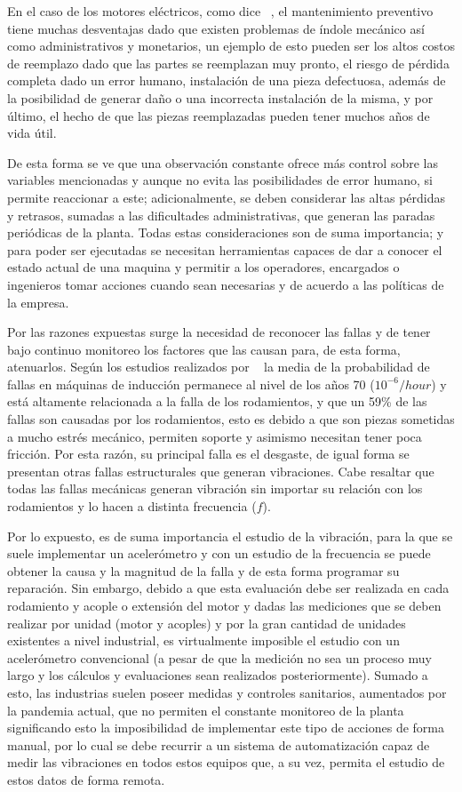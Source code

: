 En el caso de los motores eléctricos, como dice ~\textcite{Lacey}, el
mantenimiento preventivo tiene muchas desventajas dado que existen problemas de
índole mecánico así como administrativos y monetarios, un ejemplo de esto
pueden ser los altos costos de reemplazo dado que las partes se reemplazan muy
pronto, el riesgo de pérdida completa dado un error humano, instalación de una
pieza defectuosa, además de la posibilidad de generar daño o una incorrecta
instalación de la misma, y por último, el hecho de que las piezas reemplazadas
pueden tener muchos años de vida útil.

De esta forma se ve que una observación constante ofrece más control sobre las
variables mencionadas y aunque no evita las posibilidades de error humano, si
permite reaccionar a este; adicionalmente, se deben considerar las altas
pérdidas y retrasos, sumadas a las dificultades administrativas, que generan
las paradas periódicas de la planta. Todas estas consideraciones son de suma
importancia; y para poder ser ejecutadas se necesitan herramientas capaces de
dar a conocer el estado actual de una maquina y permitir a los operadores,
encargados o ingenieros tomar acciones cuando sean necesarias y de acuerdo a
las políticas de la empresa.

Por las razones expuestas surge la necesidad de reconocer las fallas y de tener
bajo continuo monitoreo los factores que las causan para, de esta forma,
atenuarlos. Según los estudios realizados por ~\textcite{Kammermann} la media
de la probabilidad de fallas en máquinas de inducción permanece al nivel de los
años 70 ($10^{-6}/hour$) y está altamente relacionada a la falla de los
rodamientos, y que un 59\% de las fallas son causadas por los rodamientos, esto
es debido a que son piezas sometidas a mucho estrés mecánico, permiten soporte
y asimismo necesitan tener poca fricción. Por esta razón, su principal falla es
el desgaste, de igual forma se presentan otras fallas estructurales que generan
vibraciones. Cabe resaltar que todas las fallas mecánicas generan vibración sin
importar su relación con los rodamientos y lo hacen a distinta frecuencia
($f$).

Por lo expuesto, es de suma importancia el estudio de la vibración, para la que
se suele implementar un acelerómetro y con un estudio de la frecuencia se puede
obtener la causa y la magnitud de la falla y de esta forma programar su
reparación. Sin embargo, debido a que esta evaluación debe ser realizada en
cada rodamiento y acople o extensión del motor  y dadas las mediciones que se
deben realizar por unidad (motor y acoples) y por la gran cantidad de unidades
existentes a nivel industrial, es virtualmente imposible el estudio con un
acelerómetro convencional (a pesar de que la medición no sea un proceso muy
largo y los cálculos y evaluaciones sean realizados posteriormente). Sumado a
esto, las industrias suelen poseer medidas y controles sanitarios, aumentados
por la pandemia actual, que no permiten el constante monitoreo de la planta
significando esto la imposibilidad de implementar este tipo de acciones de
forma manual, por lo cual se debe recurrir a un sistema de automatización capaz
de medir las vibraciones en todos estos equipos que, a su vez, permita el
estudio de estos datos de forma remota.
